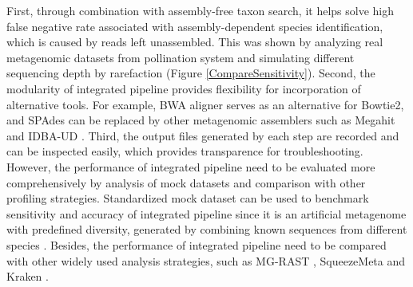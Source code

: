 \documentclass[11pt]{article}
\begin{document}
First, through combination with assembly-free taxon search, it helps solve high false negative rate associated with assembly-dependent species identification, which is caused by reads left unassembled. 
This was shown by analyzing real metagenomic datasets from pollination system and simulating different sequencing depth by rarefaction (Figure \ref{CompareSensitivity}). 
Second, the modularity of integrated pipeline provides flexibility for incorporation of alternative tools. 
For example, BWA aligner \citep{li2009fast} serves as an alternative for Bowtie2, and SPAdes can be replaced by other metagenomic assemblers such as Megahit \citep{li2015megahit} and IDBA-UD \citep{peng2012idba}. 
Third, the output files generated by each step are recorded and can be inspected easily, which provides transparence for troubleshooting. 
However, the performance of integrated pipeline need to be evaluated more comprehensively by analysis of mock datasets and comparison with other profiling strategies. 
Standardized mock dataset can be used to benchmark sensitivity and accuracy of integrated pipeline since it is an artificial metagenome with predefined diversity, generated by combining known sequences from different species \citep{vollmers2017comparing,sczyrba2017critical,becker2020modular}. 
Besides, the performance of integrated pipeline need to be compared with other widely used analysis strategies, such as MG-RAST \citep{meyer2008metagenomics}, SqueezeMeta \citep{tamames2019squeezemeta} and Kraken \citep{wood2014kraken}. 
\end{document}
